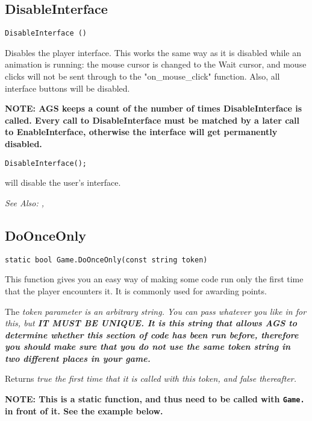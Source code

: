 \subsection{DisableInterface}\label{DisableInterface}%

\begin{verbatim}
DisableInterface ()
\end{verbatim}
Disables the player interface. This works the same way as it is disabled
while an animation is running: the mouse cursor is changed to the Wait
cursor, and mouse clicks will not be sent through to the "on_mouse_click"
function. Also, all interface buttons will be disabled.

\bf{NOTE:} AGS keeps a count of the number of times DisableInterface is called. Every
call to DisableInterface must be matched by a later call to EnableInterface, otherwise
the interface will get permanently disabled.

\begin{verbatim}
DisableInterface();
\end{verbatim}
will disable the user's interface.

\it{See Also:} , 


\subsection{DoOnceOnly}\label{Game.DoOnceOnly}%

\begin{verbatim}
static bool Game.DoOnceOnly(const string token)
\end{verbatim}
This function gives you an easy way of making some code run only the first time that
the player encounters it. It is commonly used for awarding points.

The \it{token} parameter is an arbitrary string. You can pass whatever you like in
for this, but \bf{IT MUST BE UNIQUE}. It is this string that allows AGS to determine
whether this section of code has been run before, therefore you should make sure
that \bf{you do not use the same token string in two different places in your game}.

Returns \it{true} the first time that it is called with this token, and \it{false} thereafter.

\bf{NOTE:} This is a static function, and thus need to be called with \verb$Game.$ in front of it. See
the example below.

